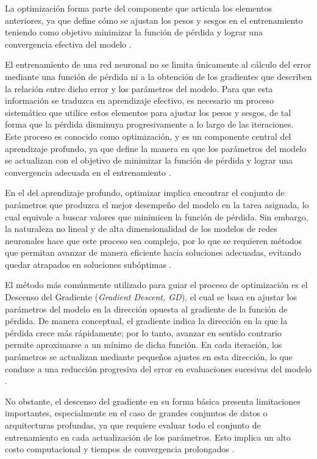 	La optimización forma parte del componente que articula los elementos anteriores, ya que define cómo se ajustan los pesos y sesgos en el entrenamiento teniendo como objetivo minimizar la función de pérdida y lograr una convergencia efectiva del modelo \cite{goodfellow2016dl, bishop2006}.
	
	El entrenamiento de una red neuronal no se limita únicamente al cálculo del error mediante una función de pérdida ni a la obtención de los gradientes que describen la relación entre dicho error y los parámetros del modelo. Para que esta información se traduzca en aprendizaje efectivo, es necesario un proceso sistemático que utilice estos elementos para ajustar los pesos y sesgos, de tal forma que la pérdida disminuya progresivamente a lo largo de las iteraciones. Este proceso es conocido como optimización, y es un componente central del aprendizaje profundo, ya que define la manera en que los parámetros del modelo se actualizan con el objetivo de minimizar la función de pérdida y lograr una convergencia adecuada en el entrenamiento \cite{goodfellow2016dl, bishop2006, ruder2016overview}.
	
	En el del aprendizaje profundo, optimizar implica encontrar el conjunto de parámetros que produzca el mejor desempeño del modelo en la tarea asignada, lo cual equivale a buscar valores que minimicen la función de pérdida. Sin embargo, la naturaleza no lineal y de alta dimensionalidad de los modelos de redes neuronales hace que este proceso sea complejo, por lo que se requieren métodos que permitan avanzar de manera eficiente hacia soluciones adecuadas, evitando quedar atrapados en soluciones subóptimas \cite{bishop2006, goodfellow2016dl}.
	
	El método más comúnmente utilizado para guiar el proceso de optimización es el Descenso del Gradiente (\textit{Gradient Descent, GD}), el cual se basa en ajustar los parámetros del modelo en la dirección opuesta al gradiente de la función de pérdida. De manera conceptual, el gradiente indica la dirección en la que la pérdida crece más rápidamente; por lo tanto, avanzar en sentido contrario permite aproximarse a un mínimo de dicha función. En cada iteración, los parámetros se actualizan mediante pequeños ajustes en esta dirección, lo que conduce a una reducción progresiva del error en evaluaciones sucesivas del modelo \cite{geron2019}.
	
	No obstante, el descenso del gradiente en su forma básica presenta limitaciones importantes, especialmente en el caso de grandes conjuntos de datos o arquitecturas profundas, ya que requiere evaluar todo el conjunto de entrenamiento en cada actualización de los parámetros. Esto implica un alto costo computacional y tiempos de convergencia prolongados \cite{bishop2006, geron2019}.
	
